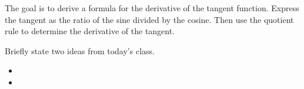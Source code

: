 \begin{problem}
  \clearpage

\item The goal is to derive a formula for the derivative of the
  tangent function. Express the tangent as the ratio of the sine
  divided by the cosine. Then use the quotient rule to determine the
  derivative of the tangent.


  \vfill

\end{problem}

\postClass

\begin{problem}
\item Briefly state two ideas from today's class.
  \begin{itemize}
  \item 
  \item 
  \end{itemize}
\item 
  \begin{subproblem}
    \item
  \end{subproblem}
\end{problem}


